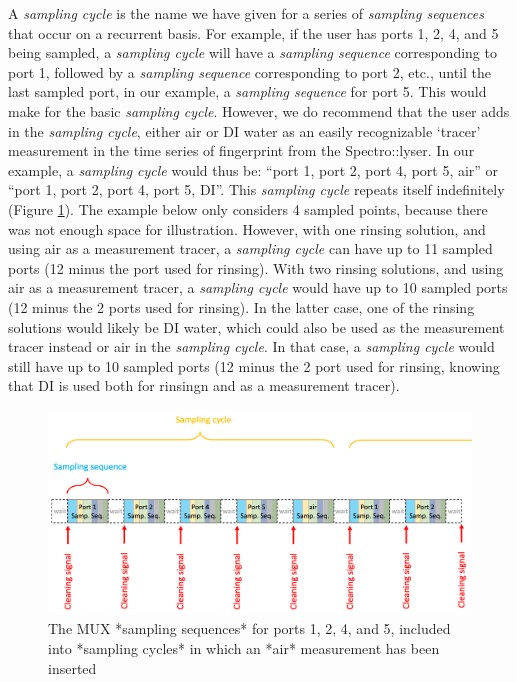 \documentclass[]{book}
\begin{document}
A \emph{sampling cycle} is the name we have given for a series of \emph{sampling sequences} that occur on a recurrent basis. For example, if the user has ports 1, 2, 4, and 5 being sampled, a \emph{sampling cycle} will have a \emph{sampling sequence} corresponding to port 1, followed by a \emph{sampling sequence} corresponding to port 2, etc., until the last sampled port, in our example, a \emph{sampling sequence} for port 5. This would make for the basic \emph{sampling cycle}. However, we do recommend that the user adds in the \emph{sampling cycle}, either air or DI water as an easily recognizable `tracer' measurement in the time series of fingerprint from the Spectro::lyser. In our example, a \emph{sampling cycle} would thus be: ``port 1, port 2, port 4, port 5, air'' or ``port 1, port 2, port 4, port 5, DI''. This \emph{sampling cycle} repeats itself indefinitely (Figure \ref{fig:SamplingCycle}). The example below only considers 4 sampled points, because there was not enough space for illustration. However, with one rinsing solution, and using air as a measurement tracer, a \emph{sampling cycle} can have up to 11 sampled ports (12 minus the port used for rinsing). With two rinsing solutions, and using air as a measurement tracer, a \emph{sampling cycle} would have up to 10 sampled ports (12 minus the 2 ports used for rinsing). In the latter case, one of the rinsing solutions would likely be DI water, which could also be used as the measurement tracer instead or air in the \emph{sampling cycle}. In that case, a \emph{sampling cycle} would still have up to 10 sampled ports (12 minus the 2 port used for rinsing, knowing that DI is used both for rinsingn and as a measurement tracer).

\begin{figure}

{\centering \includegraphics[width=1\linewidth]{pictures/SamplingCycle} 

}

\caption{The MUX *sampling sequences* for ports 1, 2, 4, and 5, included into *sampling cycles* in which an *air* measurement has been inserted}\label{fig:SamplingCycle}
\end{figure}
\end{document}
